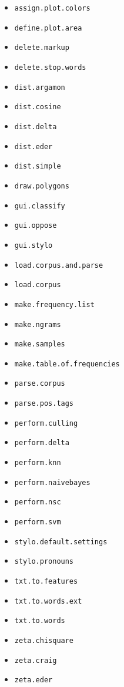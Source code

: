 \documentclass[11pt,a4paper]{article}
\def\code#1{{\tt #1}}
\begin{document}
\begin{itemize}
  \item \code{assign.plot.colors} 
  \item \code{define.plot.area} 
  \item \code{delete.markup}
  \item \code{delete.stop.words}
  \item \code{dist.argamon}
  \item \code{dist.cosine}
  \item \code{dist.delta}
  \item \code{dist.eder}
  \item \code{dist.simple}
  \item \code{draw.polygons}
  \item \code{gui.classify} 
  \item \code{gui.oppose}
  \item \code{gui.stylo} 
  \item \code{load.corpus.and.parse} 
  \item \code{load.corpus} 
  \item \code{make.frequency.list}
  \item \code{make.ngrams} 
  \item \code{make.samples} 
  \item \code{make.table.of.frequencies} 
  \item \code{parse.corpus}
  \item \code{parse.pos.tags}
  \item \code{perform.culling}  
  \item \code{perform.delta}
  \item \code{perform.knn}
  \item \code{perform.naivebayes}
  \item \code{perform.nsc}
  \item \code{perform.svm}
  \item \code{stylo.default.settings} 
  \item \code{stylo.pronouns} 
  \item \code{txt.to.features} 
  \item \code{txt.to.words.ext} 
  \item \code{txt.to.words} 
  \item \code{zeta.chisquare}
  \item \code{zeta.craig}
  \item \code{zeta.eder}
\end{itemize}
\end{document}
